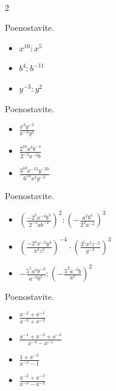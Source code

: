    ~\\
    \begin{multicols}{2}
        
            \begin{naloga}
                Poenostavite.
                \begin{itemize}
                    \item $x^{10}:x^5$ 
                    \item $b^4:b^{-11}$ 
                    \item $y^{-3}:y^2$ 
                \end{itemize}
            \end{naloga}

            \begin{naloga}
                Poenostavite.
                \begin{itemize}
                    \item $\frac{x^3y^{-2}}{x^{-2}y^3}$ 
                    \item $\frac{2^{10}a^4b^{-4}}{2^{-2}a^{-2}b}$ 
                    \item $\frac{3^{10}x^{-12}y^{-20}}{6^{10}x^2y^{-3}}$ 
                \end{itemize}
            \end{naloga}


            \begin{naloga}
                Poenostavite.
                \begin{itemize}
                    \item $\left(\frac{-2^5a^{-4}b^3}{2^{-2}ab^{-2}}\right)^2:\left(-\frac{a^2b^4}{2^3a^{-2}}\right)^3$ 
                    \item $\left(\frac{-3^4x^{-2}y^3}{x^3z^2}\right)^{-4}\cdot\left(\frac{3^5x^2z^{-2}}{y^{-3}}\right)^3$ 
                    \item $-\frac{5^5a^4b^{-3}}{a^{-3}b^2}:\left(-\frac{5^2a^{-2}b}{a^2}\right)^2$ 
                \end{itemize}
            \end{naloga}


            \begin{naloga}
                Poenostavite.
                \begin{itemize}
                    \item $\frac{x^{-2}+x^{-1}}{x^{-3}+x^{-2}}$ 
                    \item $\frac{x^{-1}+x^{-2}+x^{-3}}{x^{-4}-x^{-1}}$ 
                    \item $\frac{1+x^{-2}}{x^{-4}-1}$ 
                    \item $\frac{x^{-2}+x^{-3}}{x^{-3}-x^{-2}}$ 
                \end{itemize}
            \end{naloga}



\end{multicols}

